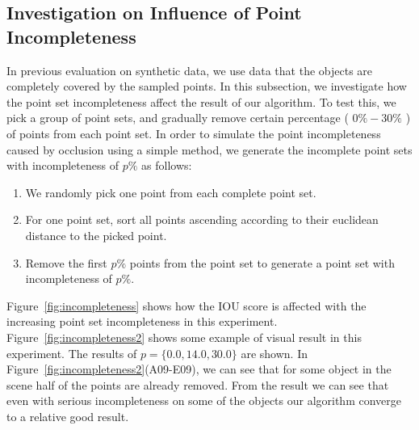 \subsection{Investigation on Influence of Point Incompleteness}
\label{sec:exp-incompleteness}
In previous evaluation on synthetic data, we use data that the objects are completely covered by the sampled points. 
%
In this subsection, we investigate how the point set incompleteness affect the result of our algorithm. 
%
To test this, we pick a group of point sets, and gradually remove certain percentage ( $0\%-30\%$ ) of points from each point set. In order to simulate the point incompleteness caused by occlusion using a simple method, we generate the incomplete point sets with incompleteness of $p\%$ as follows:
\begin{enumerate}
	\item We randomly pick one point from each complete point set. 
	\item For one point set, sort all points ascending according to their euclidean distance to the picked point.  
	\item Remove the first $p\%$ points from the point set to generate a point set with incompleteness of $p\%$.
\end{enumerate}
% 
Figure~\ref{fig:incompleteness} shows how the IOU score is affected with the increasing point set incompleteness in this experiment. 
Figure~\ref{fig:incompleteness2} shows some example of visual result in this experiment. The results of $p=\{0.0,14.0,30.0\}$ are shown. In Figure~\ref{fig:incompleteness2}(A09-E09), we can see that for some object in the scene half of the points are already removed. From the result we can see that even with serious incompleteness on some of the objects our algorithm converge to a relative good result.

